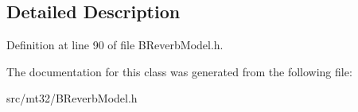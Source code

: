 \subsection{Detailed Description}


Definition at line 90 of file B\-Reverb\-Model.\-h.



The documentation for this class was generated from the following file\-:\begin{DoxyCompactItemize}
\item 
src/mt32/B\-Reverb\-Model.\-h\end{DoxyCompactItemize}
